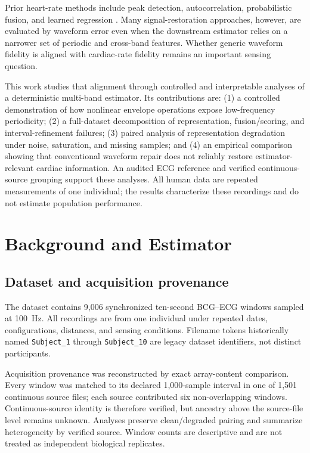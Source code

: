 \documentclass[10pt,twocolumn]{article}
\begin{document}
Prior heart-rate methods include peak detection, autocorrelation, probabilistic fusion, and learned regression \cite{brueser2020autocorrelation,jung2021loadcells,jiao2021bilstm}. Many signal-restoration approaches, however, are evaluated by waveform error even when the downstream estimator relies on a narrower set of periodic and cross-band features. Whether generic waveform fidelity is aligned with cardiac-rate fidelity remains an important sensing question.

This work studies that alignment through controlled and interpretable analyses of a deterministic multi-band estimator. Its contributions are: (1) a controlled demonstration of how nonlinear envelope operations expose low-frequency periodicity; (2) a full-dataset decomposition of representation, fusion/scoring, and interval-refinement failures; (3) paired analysis of representation degradation under noise, saturation, and missing samples; and (4) an empirical comparison showing that conventional waveform repair does not reliably restore estimator-relevant cardiac information. An audited ECG reference and verified continuous-source grouping support these analyses. All human data are repeated measurements of one individual; the results characterize these recordings and do not estimate population performance.

\section{Background and Estimator}
\subsection{Dataset and acquisition provenance}
The dataset contains 9,006 synchronized ten-second BCG--ECG windows sampled at 100~Hz. All recordings are from one individual under repeated dates, configurations, distances, and sensing conditions. Filename tokens historically named \texttt{Subject\_1} through \texttt{Subject\_10} are legacy dataset identifiers, not distinct participants.

Acquisition provenance was reconstructed by exact array-content comparison. Every window was matched to its declared 1,000-sample interval in one of 1,501 continuous source files; each source contributed six non-overlapping windows. Continuous-source identity is therefore verified, but ancestry above the source-file level remains unknown. Analyses preserve clean/degraded pairing and summarize heterogeneity by verified source. Window counts are descriptive and are not treated as independent biological replicates.
\end{document}
